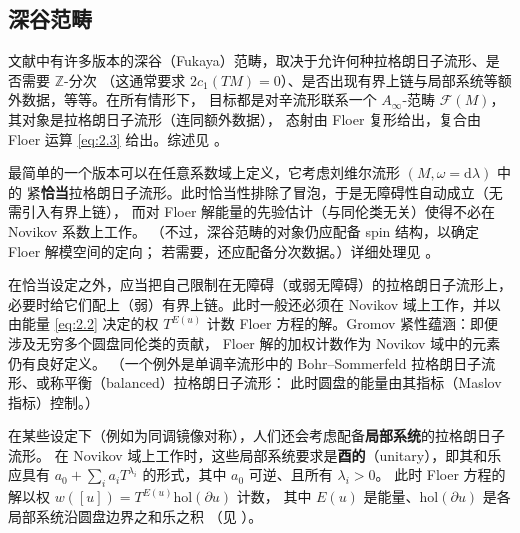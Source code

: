 \documentclass[UTF8,a4paper,11pt,fontset=windows]{ctexart}
\theoremstyle{cnthm}
\numberwithin{equation}{section}
\newcommand{\Z}{\mathbb{Z}}
\newcommand{\FF}{\mathcal{F}}         %
\begin{document}
\subsection{深谷范畴}\label{sec:2.2}

文献中有许多版本的深谷（Fukaya）范畴，取决于允许何种拉格朗日子流形、是否需要 $\Z$-分次
（这通常要求 $2c_1(TM)=0$）、是否出现有界上链与局部系统等额外数据，等等。在所有情形下，
目标都是对辛流形联系一个 $A_\infty$-范畴 $\FF(M)$，其对象是拉格朗日子流形（连同额外数据），
态射由 Floer 复形给出，复合由 Floer 运算 \eqref{eq:2.3} 给出。综述见 \cite{r22}。


最简单的一个版本可以在任意系数域上定义，它考虑刘维尔流形 $(M,\omega=\mathrm{d}\lambda)$ 中的
紧\textbf{恰当}拉格朗日子流形。此时恰当性排除了冒泡，于是无障碍性自动成立（无需引入有界上链），
而对 Floer 解能量的先验估计（与同伦类无关）使得不必在 Novikov 系数上工作。
（不过，深谷范畴的对象仍应配备 spin 结构，以确定 Floer 解模空间的定向；
若需要，还应配备分次数据。）详细处理见 \cite{r92}。

在恰当设定之外，应当把自己限制在无障碍（或弱无障碍）的拉格朗日子流形上，
必要时给它们配上（弱）有界上链。此时一般还必须在 Novikov 域上工作，并以由能量 \eqref{eq:2.2}
决定的权 $T^{E(u)}$ 计数 Floer 方程的解。Gromov 紧性蕴涵：即便涉及无穷多个圆盘同伦类的贡献，
Floer 解的加权计数作为 Novikov 域中的元素仍有良好定义。
（一个例外是单调辛流形中的 Bohr--Sommerfeld 拉格朗日子流形、或称平衡（balanced）拉格朗日子流形：
此时圆盘的能量由其指标（Maslov 指标）控制。）

在某些设定下（例如为同调镜像对称），人们还会考虑配备\textbf{局部系统}的拉格朗日子流形。
在 Novikov 域上工作时，这些局部系统要求是\textbf{酉的}（unitary），即其和乐应具有
$a_0+\sum_i a_iT^{\lambda_i}$ 的形式，其中 $a_0$ 可逆、且所有 $\lambda_i>0$。
此时 Floer 方程的解以权 $w([u])=T^{E(u)}\mathrm{hol}(\partial u)$ 计数，
其中 $E(u)$ 是能量、$\mathrm{hol}(\partial u)$ 是各局部系统沿圆盘边界之和乐之积
（见 \cite[注 2.11]{r22}）。
\end{document}
